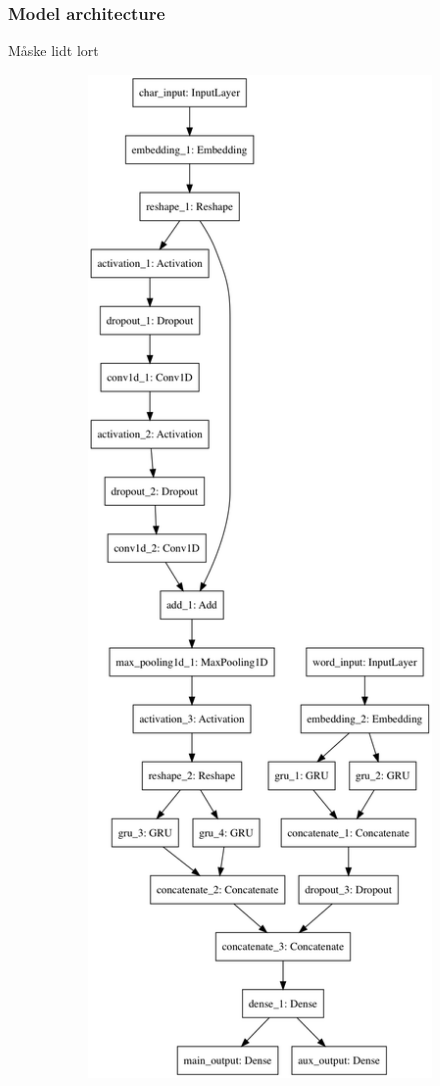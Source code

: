 \subsubsection{Model architecture}
Måske lidt lort\\
\begin{figure}[H]
    \centering
    \begin{subfigure}[b]{0.3\textwidth}
        \includegraphics[width=\textwidth]{pictures/model_full.png}

\end{subfigure}
\end{figure}
